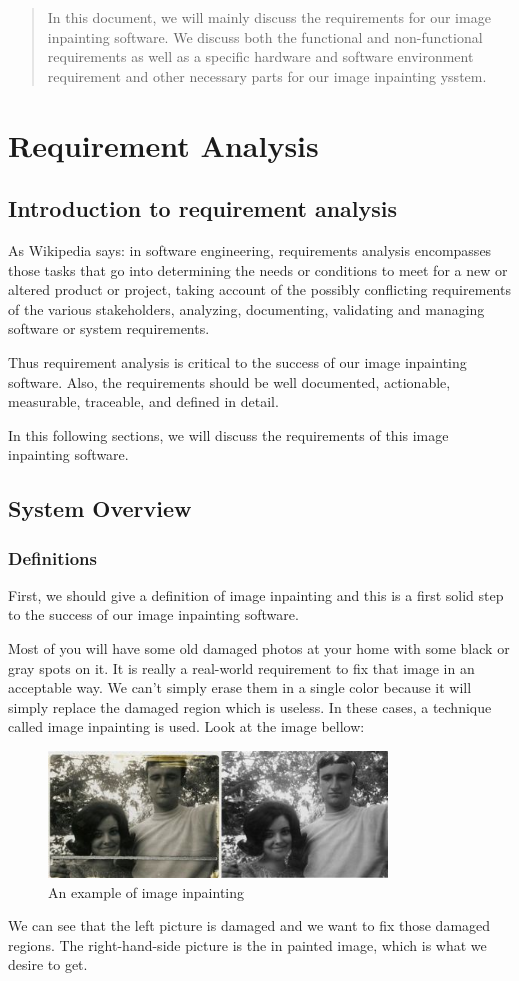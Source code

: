 \begin{abstract}
In this document, we will mainly discuss the requirements for our image inpainting software.
We discuss both the functional and non-functional requirements as well as a specific hardware and software environment requirement and other necessary parts for our image inpainting ysstem.
\end{abstract}

\section{Requirement Analysis}
\subsection{Introduction to requirement analysis}
As Wikipedia says: in software engineering, requirements analysis encompasses those tasks that go into determining the needs or conditions to meet for a new or altered product or project, taking account of the possibly conflicting requirements of the various stakeholders, analyzing, documenting, validating and managing software or system requirements.

Thus requirement analysis is critical to the success of our image inpainting software. Also, the requirements should be well documented, actionable, measurable, traceable, and defined in detail.

In this following sections, we will discuss the requirements of this image inpainting software.

\subsection{System Overview}
\subsubsection{Definitions}
First, we should give a definition of image inpainting and this is a first solid step to the success of our image inpainting software.

Most of you will have some old damaged photos at your home with some black or gray spots on it. It is really a real-world requirement to fix that image in an acceptable way. We can't simply erase them in a single color because it will simply replace the damaged region which is useless. In these cases, a technique called image inpainting is used. Look at the image bellow:
\begin{figure}[H]
\centering
\includegraphics[width=9cm]{def.jpg}
\caption{An example of image inpainting}
\end{figure}
We can see that the left picture is damaged and
we want to fix those damaged regions. The right-hand-side picture is the in painted image, which is what we desire to get.

